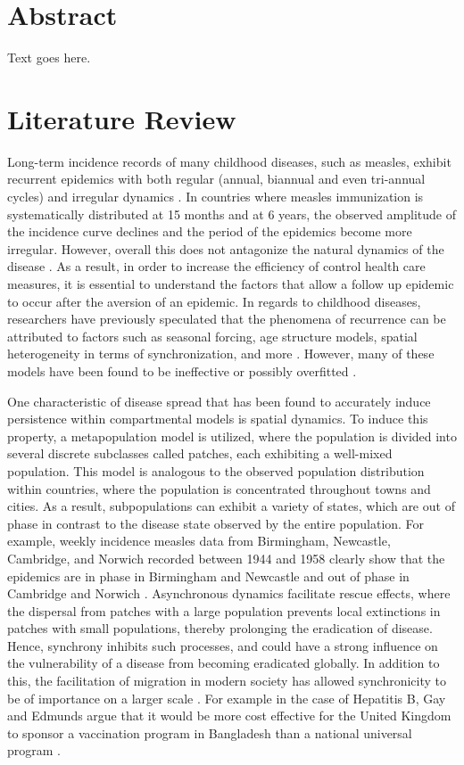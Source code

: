 \documentclass[twocolumn,nofootinbib,showkeys,twoside,floatfix,unsortedaddress,flushbottom,10pt,aps,pra]{report}
\begin{document}
% 

\twocolumn

\section{Abstract} Text goes here.
\section{Literature Review }
Long-term incidence records of many childhood diseases, such as measles, exhibit recurrent epidemics with both regular (annual, biannual and even tri-annual cycles) and irregular dynamics \cite{Earn2000}. In countries where measles immunization is systematically distributed at 15 months and at 6 years, the observed amplitude of the incidence curve declines and the period of the epidemics become more irregular. However, overall this does not antagonize the natural dynamics of the disease \cite{Samanta2014,Earn2000}. As a result, in order to increase the efficiency of control health care measures, it is essential to understand the factors that allow a follow up epidemic to occur after the aversion of an epidemic. In regards to childhood diseases, researchers have previously speculated that the phenomena of recurrence can be attributed to factors such as seasonal forcing, age structure models, spatial heterogeneity in terms of synchronization, and more \cite{Lloyd1996}. However, many of these models have been found to be ineffective or possibly overfitted \cite{Lloyd1996}. 
\par
\smallskip \qquad
One characteristic of disease spread that has been found to accurately induce persistence within compartmental models is spatial dynamics. To induce this property, a metapopulation model is utilized, where the population is divided into several discrete subclasses called patches, each exhibiting a well-mixed population. This model is analogous to the observed population distribution within countries, where the population is concentrated throughout towns and cities. As a result, subpopulations can exhibit a variety of states, which are out of phase in contrast to the disease state observed by the entire population. For example, weekly incidence measles data from Birmingham, Newcastle, Cambridge, and Norwich recorded between 1944 and 1958 clearly show that the epidemics are in phase in Birmingham and Newcastle and out of phase in Cambridge and Norwich \cite{Grenfell2001}. Asynchronous dynamics facilitate rescue effects, where the dispersal from patches with a large population prevents local extinctions in patches with small populations, thereby prolonging the eradication of disease. Hence, synchrony inhibits such processes, and could have a strong influence on the vulnerability of a disease from becoming eradicated globally. In addition to this, the facilitation of migration in modern society has allowed synchronicity to be of importance on a larger scale \cite{McCluskey2011}. For example in the case of Hepatitis B, Gay and Edmunds argue that it would be more cost effective for the United Kingdom to sponsor a vaccination program in Bangladesh than a national universal program \cite{Burton2012}. 
\end{document}
